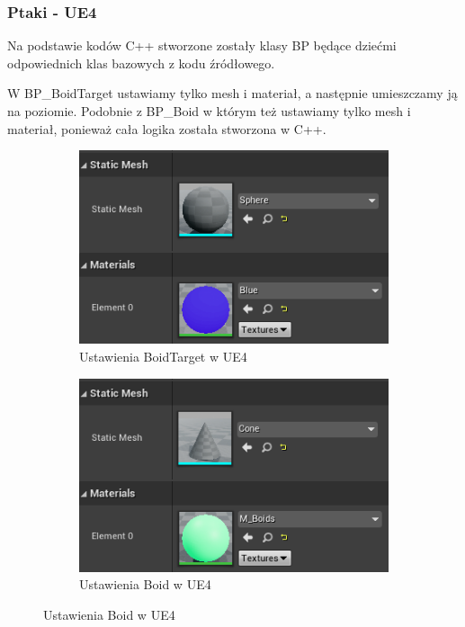\documentclass[a4paper,12pt,reqno]{article}
\begin{document}


\subsubsection{Ptaki - UE4}

Na podstawie kodów C++ stworzone zostały klasy BP będące dziećmi odpowiednich klas bazowych z kodu źródłowego. 

W BP\_BoidTarget ustawiamy tylko mesh i materiał, a następnie umieszczamy ją na poziomie. Podobnie z BP\_Boid w którym też ustawiamy tylko mesh i materiał, ponieważ cała logika została stworzona w C++.

\begin{figure}[H]%
	\centering
	\begin{subfigure}{.5\textwidth}
		\centering
		\includegraphics[width=0.9\linewidth]{graphics//boids/BP_BoidTarget.png}
		\caption{Ustawienia BoidTarget w UE4 }	
		\label{ref:subref_a}
	\end{subfigure}%
	\begin{subfigure}{.5\textwidth}
		\centering
		\includegraphics[width=0.9\linewidth]{graphics//boids/BP_Boid.png}
		\caption{Ustawienia Boid w UE4 }
		\label{ref:subref_b}
	\end{subfigure}%
\label{ref:ref}
\end{figure}
\end{document}
